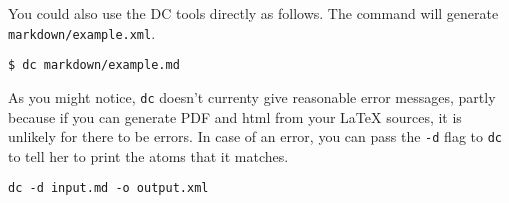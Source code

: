 \begin{gram}
You could also use the DC tools directly as follows.
%
The command will generate  \lstinline`markdown/example.xml`.

\begin{lstlisting}
$ dc markdown/example.md
\end{lstlisting}

\end{gram}

\begin{gram} 
As you might notice, \lstinline`dc` doesn't currenty give reasonable error messages, partly because if you can generate PDF and html from your LaTeX sources, it is unlikely for there to be errors. 
%
In case of an error, you can pass the \lstinline`-d` flag to \lstinline`dc` to tell her to print the atoms that it matches.
%
\begin{lstlisting}
dc -d input.md -o output.xml
\end{lstlisting}
\end{gram}



